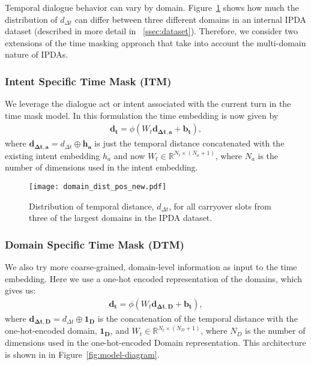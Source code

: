 \documentclass[11pt,a4paper]{article}
\begin{document}
Temporal dialogue behavior can vary by domain. Figure~\ref{fig:domain-dist} shows how much the distribution of $d_{\Delta t}$ can differ between three different domains in an internal IPDA dataset (described in more detail in ~\ref{ssec:dataset}). Therefore, we consider two extensions of the time masking approach that take into account the multi-domain nature of IPDAs.

\subsubsection{Intent Specific Time Mask (ITM)}
\label{sssec:tm-i}

We leverage the dialogue act or intent associated with the current turn in the time mask model.
In this formulation the time embedding is now given by
\begin{eqnarray}
\label{eq:time-embedding-i}
\bm{d_t}=\phi(W_t \bm{d_{\Delta t, a}} + \bm{b_t}),
\end{eqnarray}
where $\bm{d_{\Delta t, a}}=d_{\Delta t} \oplus \bm{h_a}$ is just the temporal distance concatenated with the existing intent embedding $h_a$ and now $W_{t} \in \mathbb{R}^{N_t \times (N_a + 1)}$, where $N_a$ is the number of dimensions used in the intent embedding.

\begin{figure}[htb]
\centering
\centerline{
    \texttt{[image: domain\_dist\_pos\_new.pdf]}
}
\caption{Distribution of temporal distance, $d_{\Delta t}$, for all carryover slots from three of the largest domains in the IPDA dataset.}
\label{fig:domain-dist}
\end{figure}



\subsubsection{Domain Specific Time Mask (DTM)}
\label{sssec:tm-d}

We also try more coarse-grained, domain-level information as input to the time embedding.
Here we use a one-hot encoded representation of the domains, which gives us:
\begin{eqnarray}
\label{eq:time-embedding-d}
\bm{d_t}=\phi(W_t \bm{d_{\Delta t, D}} + \bm{b_t}),
\end{eqnarray}
where $\bm{d_{\Delta t, D}}=d_{\Delta t} \oplus \bm{1_D}$ is the concatenation of the temporal distance with the one-hot-encoded domain, $\bm{1_D}$, and $W_{t} \in \mathbb{R}^{N_t \times (N_D + 1)}$, where $N_D$ is the number of dimensions used in the one-hot-encoded Domain representation.
This architecture is shown in in Figure~\ref{fig:model-diagram}.
\end{document}
